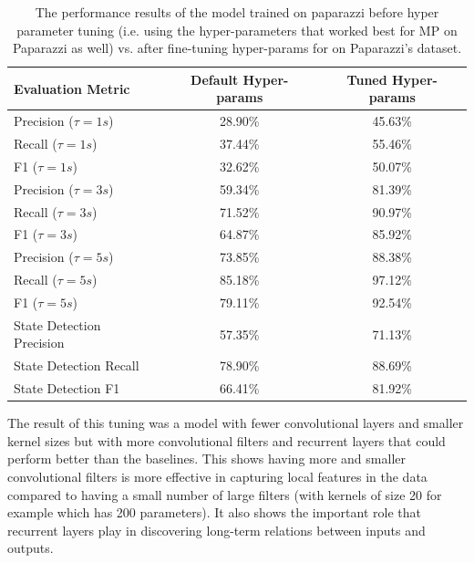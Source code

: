 \begin{table}[]
    \centering
    \begin{tabular}{lcc}
    \toprule
\textbf{Evaluation Metric} & \textbf{Default Hyper-params} & \textbf{Tuned Hyper-params} \\\midrule
Precision ($\tau=1s$)      &  28.90\%  &  45.63\% \\
Recall ($\tau=1s$)         &  37.44\%  &  55.46\% \\
F1 ($\tau=1s$)             &  32.62\%  &  50.07\% \\ \midrule
Precision ($\tau=3s$)      &  59.34\%  &  81.39\% \\
Recall ($\tau=3s$)         &  71.52\%  &  90.97\% \\
F1 ($\tau=3s$)             &  64.87\%  &  85.92\% \\ \midrule
Precision ($\tau=5s$)      &  73.85\%  &  88.38\% \\
Recall ($\tau=5s$)         &  85.18\%  &  97.12\% \\
F1 ($\tau=5s$)             &  79.11\%  &  92.54\% \\ \midrule
State Detection Precision  &  57.35\%  &  71.13\% \\
State Detection Recall     &  78.90\%  &  88.69\% \\
State Detection F1         &  66.41\%  &  81.92\% \\
\bottomrule
    \end{tabular}
    \caption{The performance results of the model trained on paparazzi before hyper parameter tuning (i.e. using the hyper-parameters that worked best for MP on Paparazzi as well) vs. after fine-tuning hyper-params for on Paparazzi's dataset.}
    \label{tab:results_no_tuning}
\end{table}

\begin{rqanswer}
The result of this tuning was a model with fewer convolutional layers and smaller kernel sizes but with more convolutional filters and recurrent layers that could perform better than the baselines. This shows having more and smaller convolutional filters is more effective in capturing local features in the data compared to having a small number of large filters (with kernels of size 20 for example which has 200 parameters). It also shows the important role that recurrent layers play in discovering long-term relations between inputs and outputs. 
\end{rqanswer}


